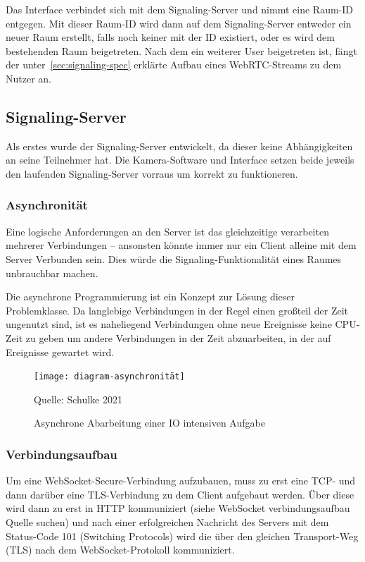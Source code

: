 \documentclass{article}
\newcommand{\figuresource}[1]{
	\begin{center}Quelle: #1\end{center}
}
\begin{document}
\begin{onecolumn}
Das Interface verbindet sich mit dem Signaling-Server und nimmt eine Raum-ID
entgegen. Mit dieser Raum-ID wird dann auf dem Signaling-Server entweder ein
neuer Raum erstellt, falls noch keiner mit der ID existiert, oder es wird dem
bestehenden Raum beigetreten. Nach dem ein weiterer User beigetreten ist, fängt
der unter~\ref{sec:signaling-spec} erklärte Aufbau eines WebRTC-Streams zu dem
Nutzer an.

\subsection{Signaling-Server}

Als erstes wurde der Signaling-Server entwickelt, da dieser keine
Abhängigkeiten an seine Teilnehmer hat. Die Kamera-Software und Interface setzen
beide jeweils den laufenden Signaling-Server vorraus um korrekt zu
funktioneren.

\subsubsection*{Asynchronität}

Eine logische Anforderungen an den Server ist das gleichzeitige verarbeiten
mehrerer Verbindungen – ansonsten könnte immer nur ein Client alleine mit dem
Server Verbunden sein. Dies würde die Signaling-Funktionalität eines Raumes
unbrauchbar machen.

Die asynchrone Programmierung ist ein Konzept zur Lösung dieser Problemklasse.
Da langlebige Verbindungen in der Regel einen großteil der Zeit ungenutzt sind,
ist es naheliegend Verbindungen ohne neue Ereignisse keine CPU-Zeit zu geben
um andere Verbindungen in der Zeit abzuarbeiten, in der auf Ereignisse gewartet
wird.

\begin{figure}[ht]
	\texttt{[image: diagram-asynchronität]}
	\centering
	\caption{Asynchrone Abarbeitung einer IO intensiven Aufgabe}
	\figuresource{Schulke 2021}
\end{figure}

\subsubsection{Verbindungsaufbau}

Um eine WebSocket-Secure-Verbindung aufzubauen, muss zu erst eine TCP- und dann
darüber eine TLS-Verbindung zu dem Client aufgebaut werden. Über diese wird
dann zu erst in HTTP kommuniziert (siehe WebSocket verbindungsaufbau Quelle
suchen) und nach einer erfolgreichen Nachricht des Servers mit dem Status-Code
101 (Switching Protocols) wird die über den gleichen Transport-Weg (TLS)
nach dem WebSocket-Protokoll kommuniziert.


\end{onecolumn}
\end{document}
